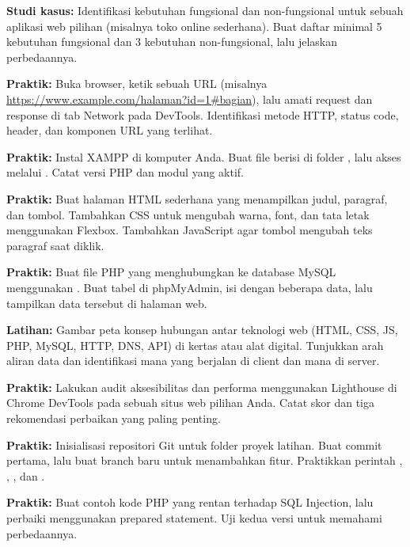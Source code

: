 \documentclass[../main.tex]{subfiles}
\begin{document}
\begin{aktivitas}
  \item \textbf{Studi kasus:} Identifikasi kebutuhan fungsional dan non-fungsional untuk sebuah aplikasi web pilihan (misalnya toko online sederhana). Buat daftar minimal 5 kebutuhan fungsional dan 3 kebutuhan non-fungsional, lalu jelaskan perbedaannya.
  \item \textbf{Praktik:} Buka browser, ketik sebuah URL (misalnya \url{https://www.example.com/halaman?id=1#bagian}), lalu amati request dan response di tab Network pada DevTools. Identifikasi metode HTTP, status code, header, dan komponen URL yang terlihat.
  \item \textbf{Praktik:} Instal XAMPP di komputer Anda. Buat file  berisi  di folder , lalu akses melalui . Catat versi PHP dan modul yang aktif.
  \item \textbf{Praktik:} Buat halaman HTML sederhana yang menampilkan judul, paragraf, dan tombol. Tambahkan CSS untuk mengubah warna, font, dan tata letak menggunakan Flexbox. Tambahkan JavaScript agar tombol mengubah teks paragraf saat diklik.
  \item \textbf{Praktik:} Buat file PHP yang menghubungkan ke database MySQL menggunakan . Buat tabel  di phpMyAdmin, isi dengan beberapa data, lalu tampilkan data tersebut di halaman web.
  \item \textbf{Latihan:} Gambar peta konsep hubungan antar teknologi web (HTML, CSS, JS, PHP, MySQL, HTTP, DNS, API) di kertas atau alat digital. Tunjukkan arah aliran data dan identifikasi mana yang berjalan di client dan mana di server.
  \item \textbf{Praktik:} Lakukan audit aksesibilitas dan performa menggunakan Lighthouse di Chrome DevTools pada sebuah situs web pilihan Anda. Catat skor dan tiga rekomendasi perbaikan yang paling penting.
  \item \textbf{Praktik:} Inisialisasi repositori Git untuk folder proyek latihan. Buat commit pertama, lalu buat branch baru untuk menambahkan fitur. Praktikkan perintah , , , dan .
  \item \textbf{Praktik:} Buat contoh kode PHP yang rentan terhadap SQL Injection, lalu perbaiki menggunakan prepared statement. Uji kedua versi untuk memahami perbedaannya.
\end{aktivitas}
\end{document}
